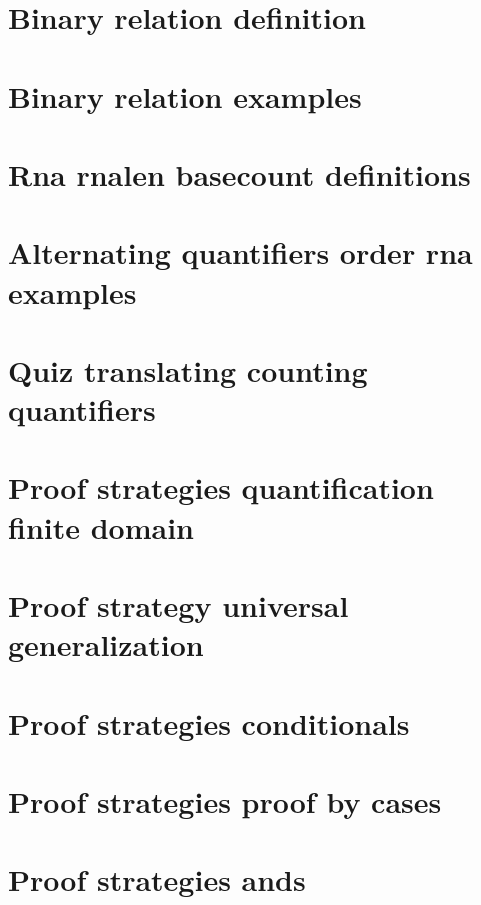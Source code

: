 \section*{Binary relation definition}

\vfill
\section*{Binary relation examples}

\vfill
\section*{Rna rnalen basecount definitions}

\vfill
\section*{Alternating quantifiers order rna examples}

\vfill
\section*{Quiz translating counting quantifiers}

\vfill
\section*{Proof strategies quantification finite domain}

\vfill
\section*{Proof strategy universal generalization}

\vfill
\section*{Proof strategies conditionals}

\vfill
\section*{Proof strategies proof by cases}

\vfill
\section*{Proof strategies ands}

\vfill
